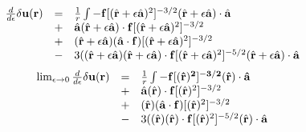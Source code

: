\documentclass[11pt]{ucthesis}
\def\br{{\bf r}}
\def\ba{\mathbf{a}}
\begin{document}
{\begin{equation}
\begin{array}{rcl}
\label{eq:forcedensityfirstderiv}
\frac{d}{d\epsilon} \delta \mathbf{u}(\br) &=& \frac{1}{r} \int 
-\mathbf{f} [(\hat{\br} + \epsilon\hat{\ba})^2]^{-3/2} (\hat{\br} + \epsilon\hat{\ba})\cdot \hat{\ba} \\
&+&\hat{\ba}(\hat{\br} + \epsilon\hat{\ba})\cdot \mathbf{f} [(\hat{\br} + \epsilon\hat{\ba})^2]^{-3/2} \\
&+& (\hat{\br} + \epsilon\hat{\ba})(\hat{\ba}\cdot\mathbf{f})[(\hat{\br} + \epsilon\hat{\ba})^2]^{-3/2}\\
&-& 3 ((\hat{\br} + \epsilon\hat{\ba})(\hat{\br} + \epsilon\hat{\ba})\cdot\mathbf{f} [(\hat{\br} + \epsilon\hat{\ba})^2]^{-5/2} (\hat{\br} + \epsilon\hat{\ba})\cdot \hat{\ba}
\end{array}
\end{equation}
\begin{equation}
\begin{array}{rcl}
\label{eq:forcedensitylimit}
\lim_{\epsilon\to 0} \frac{d}{d\epsilon} \delta \mathbf{u}(\br) &=& \frac{1}{r} \int 
-\bf f [(\hat{\br})^2]^{-3/2} (\hat{\br})\cdot \hat{\ba} \\
&+&\hat{\ba}(\hat{\br})\cdot \mathbf{f} [(\hat{\br})^2]^{-3/2} \\
&+& (\hat{\br})(\hat{\ba}\cdot\mathbf{f})[(\hat{\br})^2]^{-3/2} \\
&-& 3 ((\hat{\br})(\hat{\br})\cdot\mathbf{f} [(\hat{\br})^2]^{-5/2} (\hat{\br})\cdot \hat{\ba}
\end{array}
\end{equation}

}
\end{document}

